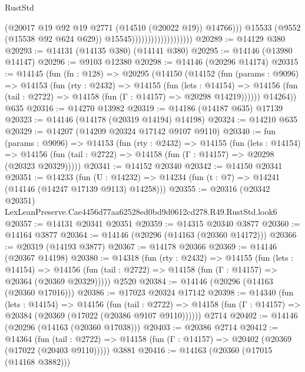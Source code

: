 \begin{lexlean}{RustStd}
\begin{coremodule}
                                              (@20017
                                                @19
                                                @92
                                                @19
                                                @2771
                                                (@14510 (@20022 @19))
                                                @14766)))
                                          @15533
                                          (@9552 (@15538 @92 @624 @629))
                                          @15545)))))))))))))))))))
@20289 := @14129 @380
@20293 := @14131 (@14135 @380) (@14141 @380)
@20295 := @14146 (@13980 @14147)
@20296 := @9103 @12380
@20298 := @14146 (@20296 @14174)
@20315 := @14145
    (fun (fn : @128) =>
    @20295
      (@14150
        (@14152
          (fun (params : @9096) =>
          @14153
            (fun (rty : @2432) =>
            @14155
              (fun (lets : @14154) =>
              @14156 (fun (tail : @2722) => @14158 (fun (Γ : @14157) => @20298 @14219))))))
        @14264))
    @635
@20316 := @14270 @13982
@20319 := @14186 (@14187 @635) @17139
@20323 := @14146 (@14178 (@20319 @14194) @14198)
@20324 := @14210 @635
@20329 := @14207 (@14209 @20324 @17142 @9107 @9110)
@20340 := fun (params : @9096) =>
  @14153
    (fun (rty : @2432) =>
    @14155
      (fun (lets : @14154) =>
      @14156 (fun (tail : @2722) => @14158 (fun (Γ : @14157) => @20298 (@20323 @20329)))))
@20341 := @14152 @20340
@20342 := @14150 @20341
@20351 := @14233
    (fun (U : @14232) => @14234 (fun (t : @7) => @14241 (@14146 (@14247 @17139 @9113) @14258)))
@20355 := @20316 (@20342 @20351) LexLeanPreserve.Cae4456d77aa62528ed0bd9d0612cd278.R49.RustStd.look6
@20357 := @14131 @20341 @20351
@20359 := @14315 @20340 @3877
@20360 := @14164 @3877
@20364 := @14146 (@20296 (@14163 (@20360 @14172)))
@20366 := @20319 (@14193 @3877)
@20367 := @14178 @20366
@20369 := @14146 (@20367 @14198)
@20380 := @14318
    (fun (rty : @2432) =>
    @14155
      (fun (lets : @14154) =>
      @14156 (fun (tail : @2722) => @14158 (fun (Γ : @14157) => @20364 (@20369 @20329)))))
    @2520
@20384 := @14146 (@20296 (@14163 (@20360 @17016)))
@20386 := @17023 @20324 @17142
@20398 := @14340
    (fun (lets : @14154) =>
    @14156
      (fun (tail : @2722) =>
      @14158 (fun (Γ : @14157) => @20384 (@20369 (@17022 (@20386 @9107 @9110))))))
    @2714
@20402 := @14146 (@20296 (@14163 (@20360 @17038)))
@20403 := @20386 @2714
@20412 := @14364
    (fun (tail : @2722) => @14158 (fun (Γ : @14157) => @20402 (@20369 (@17022 (@20403 @9110)))))
    @3881
@20416 := @14163 (@20360 (@17015 (@14168 @3882)))

\end{coremodule}
\end{lexlean}

